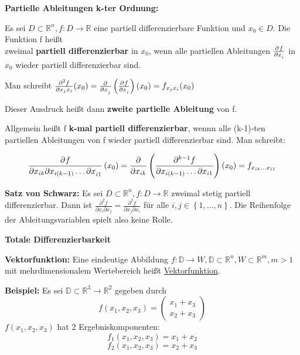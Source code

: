 \documentclass[fontset=ubuntu,12pt,a4paper,fleqn]{article}
\begin{document}
\textbf{Partielle Ableitungen k-ter Ordnung:}

Es sei \(D\subset\mathbb{R}^n,f:D\to\mathbb{R}\) eine partiell differenzierbare Funktion und \(x_0 \in D\). Die Funktion f heißt \\ zweimal \textbf{partiell differenzierbar} in \(x_0\), wenn alle partiellen Ableitungen \(\pd{f}{x_i}\) in \(x_0\) wieder partiell differenzierbar sind.

Man schreibt \(\frac{\partial^2 f}{\partial x_j x_i}(x_0)=\pd{}{x_j}\left(\pd{f}{x_i}\right)(x_0)=f_{x_j x_i}(x_0)\)

Dieser Ausdruck heißt dann \textbf{zweite partielle Ableitung} von f.

Allgemein heißt f \textbf{k-mal partiell differenzierbar}, wennn alle (k-1)-ten partiellen Ableitungen von f wieder partiell differenzierbar sind. Man schreibt:

\[\dpd{f}{x_{ik} \partial x_{i(k-1)} \dots \partial x_{i1}}(x_0) = \frac{\partial}{\partial x_{ik}}\left(\frac{\partial^{k-1} f}{\partial x_{i(k-1)} \dots \partial x_{i1}}\right)(x_0)=f_{x_{ik} \dots x_{i1}}\]

\textbf{Satz von Schwarz:}
Es sei \(D\subset\mathbb{R}^n,f:D\to\mathbb{R}\) zweimal stetig partiell differenzierbar. Dann ist \(\frac{\partial^2 f}{\partial x_i \partial x_j}=\frac{\partial^2 f}{\partial x_j \partial x_i}\) für alle \(i,j\in\left\{1,\dots,n\right\}\). Die Reihenfolge der Ableitungsvariablen spielt also keine Rolle.
\newpage








{\Large\textbf{Totale Differenzierbarkeit}\par}
\textbf{Vektorfunktion:}
Eine eindeutige Abbildung \(f:\mathbb{D}\to W,\mathbb{D}\subset\mathbb{R}^n,W\subset\mathbb{R}^m,m>1\) mit mehrdimensionalem Wertebereich heißt \underline{Vektorfunktion}.
     
\begin{multicols}{2}
\textbf{Beispiel:}
Es sei \(\mathbb{D}\subset\mathbb{R}^3\to\mathbb{R}^2\) gegeben durch
\[f(x_1,x_2,x_3)=\begin{pmatrix}
x_1+x_3 \\ x_2+x_3
\end{pmatrix}\]
$f(x_1,x_2,x_3)$ hat 2 Ergebniskomponenten:
\[f_1(x_1,x_2,x_3)=x_1+x_2\]
\[f_2(x_1,x_2,x_3)=x_2+x_3\]
\end{multicols}
\end{document}
